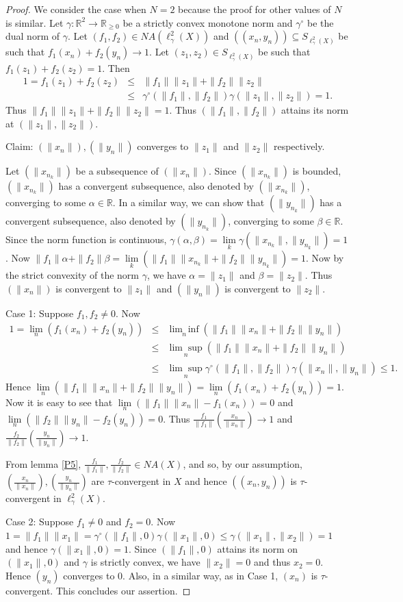 \documentclass[11pt]{amsart}
\newcommand{\ra}{\rightarrow}
\newcommand{\ci}{\subseteq}
\newcommand{\al}{\alpha}
\newcommand{\be}{\beta}
\newcommand{\ga}{\gamma}
\newcommand{\mb}{\mathbb}
\newcommand{\cc}{\circ}
\newcommand{\beqa}{\begin{eqnarray*}}
\newcommand{\eeqa}{\end{eqnarray*}}
\begin{document}
\begin{proof}
We consider the case when $N=2$ because the proof for other values of $N$ is similar. Let $\ga:\mb{R}^2\ra\mb{R}_{\geq0}$ be a strictly convex monotone norm and $\ga^\cc$ be the dual norm of $\ga$. Let $(f_1,f_2)\in NA(\ell_\ga^2(X))$ and $((x_n,y_n))\ci S_{\ell_\ga^2(X)}$ be such that $f_1(x_n)+f_2(y_n)\ra 1$.
Let $(z_1,z_2)\in S_{\ell_\ga^2(X)}$ be such that $f_1(z_1)+f_2(z_2)=1$.
 Then
\beqa
1=f_1(z_1)+f_2(z_2)&\leq&\|f_1\|\|z_1\|+\|f_2\|\|z_2\|\\
&\leq&\ga^\cc(\|f_1\|,\|f_2\|)\ga(\|z_1\|,\|z_2\|)=1.
\eeqa
Thus $\|f_1\|\|z_1\|+\|f_2\|\|z_2\|=1$. Thus $(\|f_1\|,\|f_2\|)$ attains its norm at $(\|z_1\|,\|z_2\|)$. 

{\sc Claim: } $(\|x_n\|), (\|y_n\|)$ converges to $\|z_1\|$ and $\|z_2\|$ respectively.  

Let $(\|x_{n_k}\|)$ be a subsequence of $(\|x_n\|)$. Since $(\|x_{n_k}\|)$ is bounded, $(\|x_{n_k}\|)$ has a convergent subsequence, also denoted by $(\|x_{n_k}\|)$, converging to some $\al\in\mb{R}$. In a similar way, we can show that $(\|y_{n_k}\|)$ has a convergent subsequence, also denoted by $(\|y_{n_k}\|)$, converging to some $\be\in\mb{R}$. Since the norm function is continuous, $\ga(\al,\be)=\underset{k}{\lim}\ga(\|x_{n_k}\|,\|y_{n_k}\|)=1$. Now $\|f_1\|\al+\|f_2\|\be=\underset{k}{\lim}(\|f_1\|\|x_{n_k}\|+\|f_2\|\|y_{n_k}\|)=1$. Now by the strict convexity of the norm $\ga$, we have $\al=\|z_1\|$ and $\be=\|z_2\|$. Thus $(\|x_n\|)$ is convergent to $\|z_1\|$ and $(\|y_n\|)$ is convergent to $\|z_2\|$.

{\sc Case 1: } Suppose $f_1,f_2\neq0$. Now 
\beqa 
1=\underset{n}{\lim}(f_1(x_n)+f_2(y_n))&\leq&\underset{n}{\lim\inf}(\|f_1\|\|x_n\|+\|f_2\|\|y_n\|)\\
&\leq&\underset{n}{\lim\sup}(\|f_1\|\|x_n\|+\|f_2\|\|y_n\|)\\
&\leq&\underset{n}{\lim\sup}\ga^\cc(\|f_1\|,\|f_2\|)\ga(\|x_n\|,\|y_n\|)\leq1.
\eeqa
Hence $\underset{n}{\lim}(\|f_1\|\|x_n\|+\|f_2\|\|y_n\|)=\underset{n}{\lim}(f_1(x_n)+f_2(y_n))=1$. Now it is easy to see that $\underset{n}{\lim}(\|f_1\|\|x_n\|-f_1(x_n))=0$ and $\underset{n}{\lim}(\|f_2\|\|y_n\|-f_2(y_n))=0$. Thus $\frac{f_1}{\|f_1\|}(\frac{x_n}{\|x_n\|})\ra 1$ and $\frac{f_2}{\|f_2\|}(\frac{y_n}{\|y_n\|})\ra1$.

From lemma \ref{P5}, $\frac{f_1}{\|f_1\|},\frac{f_2}{\|f_2\|}\in NA(X)$, and so, by our assumption, $(\frac{x_n}{\|x_n\|}),(\frac{y_n}{\|y_n\|})$ are $\tau$-convergent in $X$ and hence $((x_n,y_n))$ is $\tau$-convergent in $\ell_\ga^2(X)$. 



{\sc Case 2:} Suppose $f_1\neq0$ and $f_2=0$. Now $1=\|f_1\|\|x_1\|=\ga^\cc(\|f_1\|,0)\ga(\|x_1\|,0)\leq \ga(\|x_1\|,\|x_2\|)=1$ and hence $\ga(\|x_1\|,0)=1$. Since $(\|f_1\|,0)$ attains its norm on $(\|x_1\|,0)$ and $\ga$ is strictly convex, we have $\|x_2\|=0$ and thus $x_2=0$. Hence $(y_n)$ converges to 0. Also, in a similar way, as in Case 1, $(x_n)$ is $\tau$-convergent. This concludes our assertion. 
\end{proof}
\end{document}
